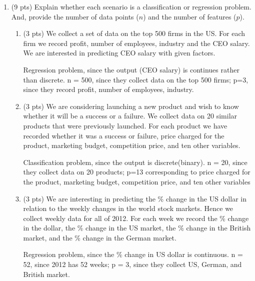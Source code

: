 \documentclass[a4paper]{article}
\theoremstyle{definition}
\newenvironment{soln}{
    \leavevmode\color{blue}\ignorespaces
}{}
\begin{document}
\begin{enumerate}
\item (9 pts) Explain whether each scenario is a classification or regression problem. And, provide the number of data points ($n$) and the number of features ($p$).

\begin{enumerate}
	\item (3 pts) We collect a set of data on the top 500 firms in the US. For each firm we record profit, number of employees, industry and the CEO salary. We are interested in predicting CEO salary with given factors.
	
	\begin{soln}
 Regression problem, since the output (CEO salary) is continues rather than discrete. n = 500, since they collect data on the top 500 firms; p=3, since they record profit, number of employees, industry.
 \end{soln}
	
	\item (3 pts) We are considering launching a new product and wish to know whether it will be a success or a failure. We collect data on 20 similar products that were previously launched. For each product we have recorded whether it was a success or failure, price charged for the product, marketing budget, competition price, and ten other variables.
	
	\begin{soln}
 Classification problem, since the output is discrete(binary). n = 20, since they collect data on 20 products; p=13 corresponding to  price charged for the product, marketing budget, competition price, and ten other variables
 \end{soln}
	
	\item (3 pts) We are interesting in predicting the \% change in the US dollar in relation to the weekly changes in the world stock markets. Hence we collect weekly data for all of 2012. For each week we record the \% change in the dollar, the \% change in the US market, the \% change in the British market, and the \% change in the German market.
	
	\begin{soln}
 Regression problem, since the \% change in US dollar is continuous. n = 52, since 2012 has 52 weeks; p = 3, since they collect US, German, and British market.
 \end{soln}
	
\end{enumerate}


\end{enumerate}
\end{document}

